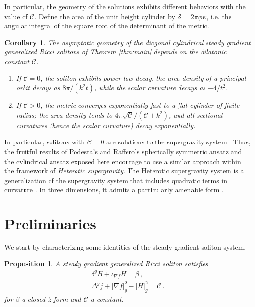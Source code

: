 \documentclass[12pt,a4paper,reqno]{amsart}
\theoremstyle{plain}
\newtheorem{proposition}[theorem]{Proposition}
\newtheorem{corollary}[theorem]{Corollary}
\theoremstyle{remark}
\numberwithin{equation}{section}
\newcommand{\cC}{\mathcal{C}}
\newcommand{\cS}{\mathcal{S}}
\begin{document}
In particular, the geometry of the solutions exhibits different behaviors with the value of $\cC$. Define the area of the unit height cylinder by $\cS = 2\pi \phi\psi$, i.e. the angular integral of the square root of the determinant of the metric.

\begin{corollary}\label{cor:cuspend}
The asymptotic geometry of the diagonal cylindrical steady gradient generalized Ricci solitons of Theorem \ref{thm:main} depends on the dilatonic constant $\cC$.
\begin{enumerate}[label=(\roman*), leftmargin=*]
\item If $\cC=0$, the soliton exhibits power‑law decay: the area density of a principal orbit decays as $8\pi/(k^{2}t)$, while the scalar curvature decays as $-4/t^2$.
\item If $\cC>0$, the metric converges exponentially fast to a flat cylinder of finite radius; the area density tends to $4\pi\sqrt{\cC}/(\cC+k^{2})$, and all sectional curvatures (hence the scalar curvature) decay exponentially.
\end{enumerate}
\end{corollary}

In particular, solitons with $\cC=0$ are solutions to the supergravity system \cite{Callanetal1985}. Thus, the fruitful results of Podesta's and Raffero's spherically symmetric ansatz and the cylindrical ansatz exposed here encourage to use a similar approach within the framework of \emph{Heterotic supergravity}. The Heterotic supergravity system is a generalization of the supergravity system that includes quadratic terms in curvature \cite{Moroianu2022,Moroianu2024}. In three dimensions, it admits a particularly amenable form \cite{Moroianu2024,Moroianu2026a,Moroianu2026b}.   


\section{Preliminaries}
\label{sec:preliminaries}

We start by characterizing some identities of the steady gradient soliton system. 

\begin{proposition}
\label{prop:sgsolitonsaresgrs}
A steady gradient generalized Ricci soliton satisfies
\begin{align}
\delta^gH + \iota_{\nabla f} H = \beta \,, \label{eq:maxwellbeta} \\
\Delta^g f + |\nabla f|_g^2 - |H|_g^2 = \cC \label{eq:dilatonC} \,.
\end{align}
for $\beta$ a closed 2-form and $\cC$ a constant.
\end{proposition}
\end{document}
